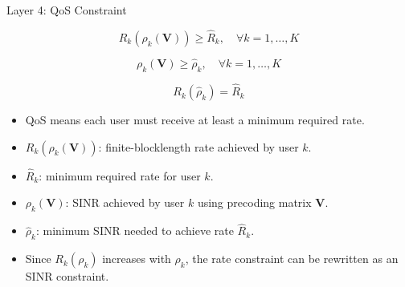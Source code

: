 \documentclass{beamer}
\begin{document}
\begin{frame}{Layer 4: QoS Constraint}
\scriptsize

\[
    R_k(\rho_k(\mathbf{V})) \ge \widehat{R}_k,
    \quad \forall k=1,\ldots,K
\]

\[
    \rho_k(\mathbf{V}) \ge \widehat{\rho}_k,
    \quad \forall k=1,\ldots,K
\]

\[
    R_k(\widehat{\rho}_k)=\widehat{R}_k
\]

\begin{itemize}
    \item QoS means each user must receive at least a minimum required rate.
    \item \(R_k(\rho_k(\mathbf{V}))\): finite-blocklength rate achieved by user \(k\).
    \item \(\widehat{R}_k\): minimum required rate for user \(k\).
    \item \(\rho_k(\mathbf{V})\): SINR achieved by user \(k\) using precoding matrix \(\mathbf{V}\).
    \item \(\widehat{\rho}_k\): minimum SINR needed to achieve rate \(\widehat{R}_k\).
    \item Since \(R_k(\rho_k)\) increases with \(\rho_k\), the rate constraint can be rewritten as an SINR constraint.
\end{itemize}

\end{frame}
\end{document}
